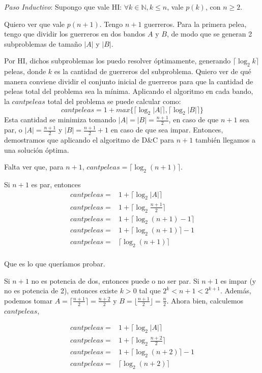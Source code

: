 \textit{Paso Inductivo}: Supongo que vale HI: $\forall k \in \mathbb{N}, k \leq n$, vale $p(k)$, con $n \geq 2$.

Quiero ver que vale $p(n+1)$.
Tengo $n+1$ guerreros. Para la primera pelea, tengo que dividir los guerreros en dos bandos $A$ y $B$, de modo que se generan 2 subproblemas de tamaño $|A|$ y $|B|$.

Por HI, dichos subproblemas los puedo resolver óptimamente, generando $\lceil \log _2 k \rceil$ peleas, donde $k$ es la cantidad de guerreros del subproblema. Quiero ver de qué manera conviene dividir el conjunto inicial de guerreros para que la cantidad de peleas total del problema sea la mínima.
Aplicando el algoritmo en cada bando, la $cantpeleas$ total del problema se puede calcular como: 
\[ cantpeleas = 1 + max\{ \lceil \log _2 |A| \rceil , \lceil \log _2 |B| \rceil \}\]
Esta cantidad se minimiza tomando $|A| = |B| = \frac{n+1}{2}$, en caso de que $n+1$ sea par, o $|A| = \frac{n+1}{2}$ y $|B| = \frac{n+1}{2} + 1$ en caso de que sea impar. Entonces, demostramos que aplicando el algoritmo de D\&C para $n+1$ también llegamos a una solución óptima.

Falta ver que, para $n+1$,  $cantpeleas = \lceil \log _2 (n+1) \rceil$.

Si $n+1$ es par, entonces
  \begin{equation}
  \begin{aligned}
  cantpeleas =& 1 + \lceil \log _2 |A| \rceil \\
  cantpeleas =& 1 + \lceil \log _2 \frac{n+1}{2} \rceil \\
  cantpeleas =& 1 + \lceil \log _2 (n+1)  - 1 \rceil \\
  cantpeleas =& 1 + \lceil \log _2 (n+1) \rceil  - 1 \\
  cantpeleas =& \lceil \log _2 (n+1) \rceil \\
  \end{aligned}
  \end{equation}

Que es lo que queríamos probar.

Si $n+1$ no es potencia de dos, entonces puede o no ser par.
Si $n + 1$ es impar (y no es potencia de 2), entonces existe $k > 0$ tal que $2^k < n + 1 < 2^{k+1}$.
Además, podemos tomar
  $A = \lceil \frac{n+1}{2} \rceil = \frac{n+2}{2}$ y
  $B = \lfloor \frac{n+1}2 \rfloor = \frac{n}2$.
Ahora bien, calculemos $cantpeleas$,

  \begin{equation}
  \begin{aligned}
  cantpeleas =& 1 + \lceil \log _2 |A| \rceil \\
  cantpeleas =& 1 + \lceil \log _2 \frac{n+2}{2} \rceil \\
  cantpeleas =& 1 + \lceil \log _2 (n+2) \rceil  - 1 \\
  cantpeleas =& \lceil \log _2 (n+2) \rceil \\
  \end{aligned}
  \end{equation}

